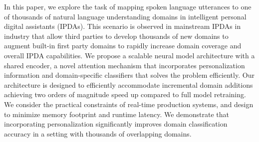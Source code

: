 In this paper, we explore the task of mapping spoken language utterances to one of thousands of natural language understanding domains in intelligent personal digital assistants (IPDAs). This scenario is observed in mainstream IPDAs in industry that allow third parties to develop thousands of new domains to augment built-in first party domains to rapidly increase domain coverage and overall IPDA capabilities. We propose a scalable neural model architecture with a shared encoder, a novel attention mechanism that incorporates personalization information and domain-specific classifiers that solves the problem efficiently. Our architecture is designed to efficiently accommodate incremental domain additions achieving two orders of magnitude speed up compared to full model retraining. We consider the practical constraints of real-time production systems, and design to minimize memory footprint and runtime latency. We demonstrate that incorporating personalization significantly improves domain classification accuracy in a setting with thousands of overlapping domains.
